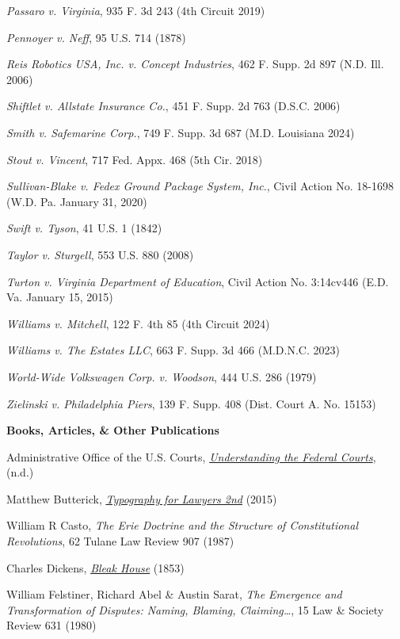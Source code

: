 \textit{Passaro v. Virginia}, 935 F. 3d 243 (4th Circuit 2019)

\textit{Pennoyer v. Neff}, 95 U.S. 714 (1878)

\textit{Reis Robotics USA, Inc. v. Concept Industries}, 462 F. Supp. 2d 897 (N.D. Ill. 2006)

\textit{Shiftlet v. Allstate Insurance Co.}, 451 F. Supp. 2d 763 (D.S.C. 2006)

\textit{Smith v. Safemarine Corp.}, 749 F. Supp. 3d 687 (M.D. Louisiana 2024)

\textit{Stout v. Vincent}, 717 Fed. Appx. 468 (5th Cir. 2018)

\textit{Sullivan-Blake v. Fedex Ground Package System, Inc}., Civil Action No. 18-1698 (W.D. Pa. January 31, 2020)

\textit{Swift v. Tyson}, 41 U.S. 1 (1842)

\textit{Taylor v. Sturgell}, 553 U.S. 880 (2008)

\textit{Turton v. Virginia Department of Education}, Civil Action No. 3:14cv446 (E.D. Va. January 15, 2015)

\textit{Williams v. Mitchell}, 122 F. 4th 85 (4th Circuit 2024)

\textit{Williams v. The Estates LLC}, 663 F. Supp. 3d 466 (M.D.N.C. 2023)

\textit{World-Wide Volkswagen Corp. v. Woodson}, 444 U.S. 286 (1979)

\textit{Zielinski v. Philadelphia Piers}, 139 F. Supp. 408 (Dist. Court A. No. 15153)

\vspace{2em}

{\bfseries\Large{Books, Articles, \& Other Publications}}

Administrative Office of the U.S. Courts, \href{https://www.uscourts.gov/sites/default/files/understanding-federal-courts.pdf}{\textit{Understanding the Federal Courts}}, (n.d.)

Matthew Butterick, \href{https://typographyforlawyers.com}{\textit{Typography for Lawyers 2nd}} (2015)

William R Casto, \textit{The Erie Doctrine and the Structure of Constitutional Revolutions}, 62 Tulane Law Review 907 (1987)

Charles Dickens, \href{https://standardebooks.org/ebooks/charles-dickens/bleak-house}{\textit{Bleak House}} (1853)

William Felstiner, Richard Abel \& Austin Sarat, \textit{The Emergence and Transformation of Disputes: Naming, Blaming, Claiming…}, 15 Law \& Society Review 631 (1980)

